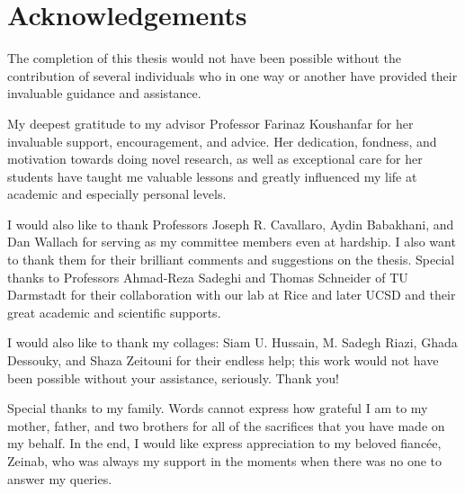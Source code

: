 \chapter*{Acknowledgements}
\thispagestyle{empty}

The completion of this thesis would not have been possible without the contribution of several individuals who in one way or another have provided their invaluable guidance and assistance.

My deepest gratitude to my advisor Professor Farinaz Koushanfar for her invaluable support, encouragement, and advice. Her dedication, fondness, and motivation towards doing novel research, as well as exceptional care for her students have taught me valuable lessons and greatly influenced my life at academic and especially personal levels.

I would also like to thank Professors Joseph R. Cavallaro, Aydin Babakhani, and Dan Wallach for serving as my committee members even at hardship. I also want to thank them for their brilliant comments and suggestions on the thesis. Special thanks to Professors Ahmad-Reza Sadeghi and Thomas Schneider of TU Darmstadt for their collaboration with our lab at Rice and later UCSD and their great academic and scientific supports.

I would also like to thank my collages: Siam U. Hussain, M. Sadegh Riazi, Ghada Dessouky, and Shaza Zeitouni for their endless help; this work would not have been possible without your assistance, seriously. Thank you!

Special thanks to my family. Words cannot express how grateful I am to my mother, father, and two brothers for all of the sacrifices that you have made on my behalf. In the end, I would like express appreciation to my beloved fianc\'ee, Zeinab, who was always my support in the moments when there was no one to answer my queries.

\clearpage
